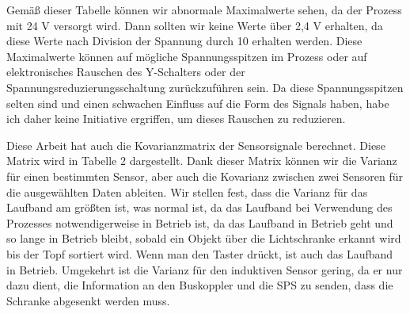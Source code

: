\documentclass[12pt,a4paper]{scrartcl}
\numberwithin{equation}{section}
\begin{document}
 \begin{table}[ht!]
    \caption{Statistische Werte für jeden Sensoren}
    \label{stat}          
\end{table}

Gemäß dieser Tabelle können wir abnormale Maximalwerte sehen, da der Prozess mit 24 V versorgt wird. Dann sollten wir keine Werte über 2,4 V erhalten, da diese Werte nach Division der Spannung durch 10 erhalten werden. Diese Maximalwerte können auf mögliche Spannungsspitzen im Prozess oder auf elektronisches Rauschen des Y-Schalters oder der Spannungsreduzierungsschaltung zurückzuführen sein. Da diese Spannungsspitzen selten sind und einen schwachen Einfluss auf die Form des Signals haben, habe ich daher keine Initiative ergriffen, um dieses Rauschen zu reduzieren. 

Diese Arbeit hat auch die Kovarianzmatrix der Sensorsignale berechnet. Diese Matrix wird in Tabelle 2 dargestellt. Dank dieser Matrix können wir die Varianz für einen bestimmten Sensor, aber auch die Kovarianz zwischen zwei Sensoren für die ausgewählten Daten ableiten. Wir stellen fest, dass die Varianz für das Laufband am größten ist, was normal ist, da das Laufband bei Verwendung des Prozesses notwendigerweise in Betrieb ist, da das Laufband in Betrieb geht und so lange in Betrieb bleibt, sobald ein Objekt über die Lichtschranke erkannt wird bis der Topf sortiert wird. Wenn man den Taster drückt, ist auch das Laufband in Betrieb. Umgekehrt ist die Varianz für den induktiven Sensor gering, da er nur dazu dient, die Information an den Buskoppler und die SPS zu senden, dass die Schranke abgesenkt werden muss. 
\end{document}
